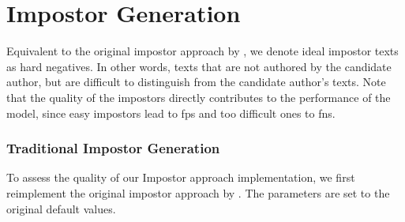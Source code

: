 \section{Impostor Generation}
\label{sec:impostor_generation}

Equivalent to the original impostor approach by \citet{koppel_determining_2014}, we denote ideal impostor texts as hard negatives.
In other words, texts that are not authored by the candidate author, but are difficult to distinguish from the candidate author's texts.
Note that the quality of the impostors directly contributes to the performance of the model, 
since easy impostors lead to \acp{fp} and too difficult ones to \acp{fn}.

\subsubsection{Traditional Impostor Generation}
\label{subsubsec:traditional_impostor_generation}

To assess the quality of our Impostor approach implementation, we first reimplement the original impostor approach by \citet{koppel_determining_2014}.
The parameters are set to the original default values.


